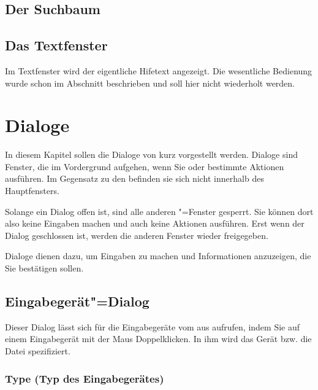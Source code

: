 \section{Der Suchbaum}
\label{sec:der-suchbaum}


\section{Das Textfenster}
\label{sec:das-textfenster}


Im Textfenster wird der eigentliche Hifetext angezeigt. Die wesentliche Bedienung wurde schon im Abschnitt  beschrieben und soll hier nicht wiederholt werden.


\chapter{Dialoge}\label{sec:DE_DIALOGS}

In diesem Kapitel sollen die Dialoge von \mutabor{} kurz vorgestellt
werden.  Dialoge sind Fenster, die im Vordergrund aufgehen, wenn Sie
oder \mutabor{} bestimmte Aktionen ausführen. Im Gegensatz zu den
 befinden sie sich nicht
innerhalb des Hauptfensters.

Solange ein Dialog offen ist, sind alle anderen \mutabor"=Fenster
gesperrt. Sie können dort also keine Eingaben machen und auch keine
Aktionen ausführen. Erst wenn der Dialog geschlossen ist, werden die
anderen Fenster wieder freigegeben.

Dialoge dienen dazu, um Eingaben zu machen und Informationen
anzuzeigen, die Sie bestätigen sollen.  

\section{Eingabegerät"=Dialog}
\label{sec:DE_R0}
Dieser Dialog lässt sich für die Eingabegeräte vom  
aus aufrufen, indem Sie auf einem Eingabegerät mit der Maus 
Doppelklicken. In ihm wird das Gerät bzw. die Datei spezifiziert.

\subsection{Type (Typ des Eingabegerätes)}


